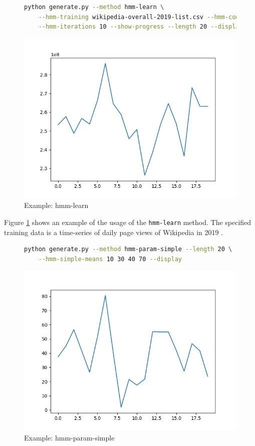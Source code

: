 \begin{figure}
\begin{lstlisting}[language=bash]
    python generate.py --method hmm-learn \
    --hmm-training wikipedia-overall-2019-list.csv --hmm-components 4 \
    --hmm-iterations 10 --show-progress --length 20 --display
\end{lstlisting}
\includegraphics[scale=0.7]{figures/hmm-learn}
\caption{Example: hmm-learn}    
\label{fig:hmm-learn-example}
\end{figure}

Figure \ref{fig:hmm-learn-example} shows an example of the usage of the \texttt{hmm-learn} method. The specified training data is a time-series of daily page views of Wikipedia in 2019 \parencite{wikipedia}.

\newpage

\begin{figure}
\begin{lstlisting}[language=bash]
    python generate.py --method hmm-param-simple --length 20 \
    --hmm-simple-means 10 30 40 70 --display
\end{lstlisting}
\includegraphics[scale=0.7]{figures/hmm-param-simple}
\caption{Example: hmm-param-simple}    
\label{fig:hmm-param-simple-example}
\end{figure}

